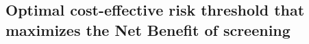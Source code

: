 \documentclass[AMA,STIX1COL]{WileyNJD-v2}
\begin{document}
%




\subsection{Optimal cost-effective risk threshold that maximizes the Net Benefit of screening}
\label{sec:optimalthreshold}
\end{document}
